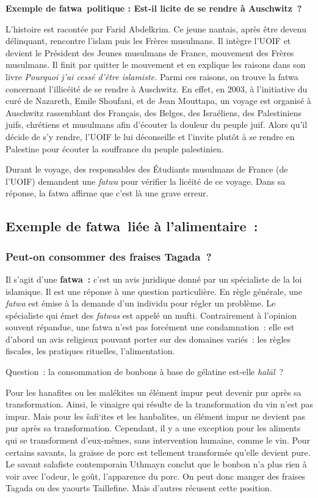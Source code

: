 \textbf{Exemple de fatwa~politique : Est-il licite de se rendre à
Auschwitz~?}

L'histoire est racontée par Farid Abdelkrim. Ce jeune nantais, après
être devenu délinquant, rencontre l'islam puis les Frères musulmans. Il
intègre l'UOIF et devient le Président des Jeunes musulmans de France,
mouvement des Frères musulmans. Il finit par quitter le mouvement et en
explique les raisons dans son livre \emph{Pourquoi j'ai cessé d'être
islamiste.} Parmi ces raisons, on trouve la fatwa concernant l'illicéité
de se rendre à Auschwitz. En effet, en 2003, à l'initiative du curé de
Nazareth, Emile Shoufani, et de Jean Mouttapa, un voyage est organisé à
Auschwitz rassemblant des Français, des Belges, des Israéliens, des
Palestiniens juifs, chrétiens et musulmans afin d'écouter la douleur du
peuple juif. Alors qu'il décide de s'y rendre, l'UOIF le lui déconseille
et l'invite plutôt à se rendre en Palestine pour écouter la souffrance
du peuple palestinien.

Durant le voyage, des responsables des Étudiants musulmans de France (de
l'UOIF) demandent une \emph{fatwa} pour vérifier la licéité de ce
voyage. Dans sa réponse, la fatwa affirme que c'est là une grave erreur.

\subsection{Exemple de fatwa~liée à l'alimentaire~:}

\subsubsection{Peut-on consommer des fraises Tagada~?}

Il s'agit d'une \textbf{fatwa~:} c'est un avis juridique donné par un
spécialiste de la loi islamique. Il est une réponse à une question
particulière. En règle générale, une \emph{fatwa} est émise à la demande
d'un individu pour régler un problème. Le spécialiste qui émet des
\emph{fatwas} est appelé un mufti. Contrairement à l'opinion souvent
répandue, une fatwa n'est pas forcément une condamnation~: elle est
d'abord un avis religieux pouvant porter sur des domaines variés~: les
règles fiscales, les pratiques rituelles, l'alimentation.

Question~: la consommation de bonbons à base de gélatine est-elle
\emph{halāl}~?

Pour les hanafites ou les malékites un élément impur peut devenir pur
après sa transformation. Ainsi, le vinaigre qui résulte de la
transformation du vin n'est pas impur. Mais pour les šafi`ites et les
hanbalites, un élément impur ne devient pas pur après sa transformation.
Cependant, il y a une exception pour les aliments qui se transforment
d'eux-mêmes, sans intervention humaine, comme le vin. Pour certains
savants, la graisse de porc est tellement transformée qu'elle devient
pure. Le savant salafiste contemporain Uthmayn conclut que le bonbon n'a
plus rien à voir avec l'odeur, le goût, l'apparence du porc. On peut
donc manger des fraises Tagada ou des yaourts Taillefine. Mais d'autres
récusent cette position.


